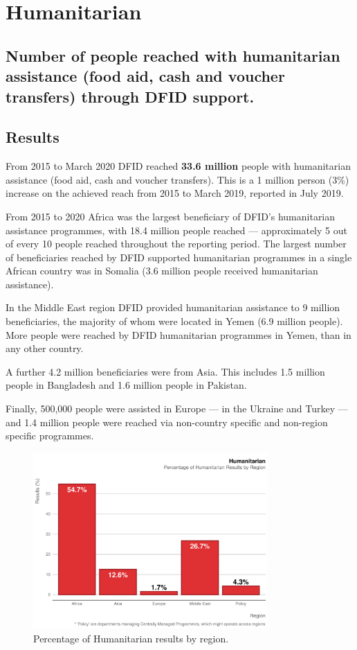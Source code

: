 \chapter{Humanitarian}

\section*{Number of people reached with humanitarian assistance (food aid, cash and voucher transfers) through DFID support.}

\thispagestyle{empty}

\section{Results}
From 2015 to March 2020 DFID reached \textbf{33.6 million} people with humanitarian assistance (food aid, cash and voucher transfers). %
This is a 1 million person (3\%) increase on the achieved reach from 2015 to March 2019, reported in July 2019. %

From 2015 to 2020 Africa was the largest beneficiary of DFID's humanitarian assistance programmes, with 18.4 million people reached --- approximately 5 out of every 10 people reached throughout the reporting period. %
The largest number of beneficiaries reached by DFID supported humanitarian programmes in a single African country was in Somalia (3.6 million people received humanitarian assistance). %

In the Middle East region DFID provided humanitarian assistance to 9 million beneficiaries, the majority of whom were located in Yemen (6.9 million people). %
More people were reached by DFID humanitarian programmes in Yemen, than in any other country. %

A further 4.2 million beneficiaries were from Asia. %
This includes 1.5 million people in Bangladesh and 1.6 million people in Pakistan. %

Finally, 500,000 people were assisted in Europe --- in the Ukraine and Turkey --- and 1.4 million people were reached via non-country specific and non-region specific programmes. %

\begin{figure}[htbp]
	\centering
	\includegraphics[width=0.8\textwidth]{../figs/human_region_plot} \hfill
	\caption{Percentage of Humanitarian results by region.}
	\label{fig:human_region_plot}
\end{figure}


